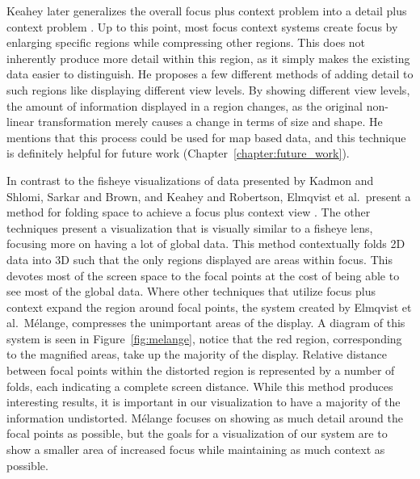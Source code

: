 Keahey later generalizes the overall focus plus context problem into a detail plus context problem \cite{Keahey1998}. Up to this point, most focus context systems create focus by enlarging specific regions while compressing other regions. This does not inherently produce more detail within this region, as it simply makes the existing data easier to distinguish. He proposes a few different methods of adding detail to such regions like displaying different view levels. By
showing different view levels, the amount of information displayed in a region changes, as the original non-linear transformation merely causes a change in terms of size and shape. He mentions that this process could be used for map based data, and this technique is definitely helpful for future work (Chapter~\ref{chapter:future_work}).

In contrast to the fisheye visualizations of data presented by Kadmon and Shlomi, Sarkar and Brown, and Keahey and Robertson,  Elmqvist et al.\ present a method for folding space to achieve a focus plus context view \cite{Kadmon1978} \cite{Sarkar1992} \cite{Keahey1996} \cite{Elmqvist2010}. The other techniques present a visualization that is visually similar to a fisheye lens, focusing more on having a lot of global data. This method contextually folds 2D data into 3D such that
the only regions displayed are areas within focus. This devotes most of the screen space to the focal points at the cost of being able to see most of the global data. Where other techniques that utilize focus plus context expand the region around focal points, the system
created by Elmqvist et al.\, M\'{e}lange, compresses the
unimportant areas of the display. A diagram of this system is seen in Figure~\ref{fig:melange}, notice that the red region, corresponding to the magnified areas, take up the majority of the display. Relative distance between focal points within the distorted region is represented by a number of folds, each indicating a complete screen distance. While this method produces interesting results, it is important in our visualization to have a majority of the information undistorted. M\'{e}lange focuses on showing as much detail around the focal points as possible, but the goals for a visualization of our system are to show a smaller area of increased focus while maintaining as much context as possible.


